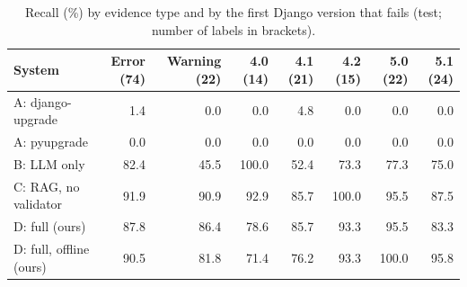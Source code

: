 \begin{table}[t]
\centering
\footnotesize
\setlength{\tabcolsep}{4pt}
\caption{Recall (\%) by evidence type and by the first Django version that fails (test; number of labels in brackets).}
\label{tab:breakdown-test}
\begin{tabular}{lrrrrrrr}
\toprule
System & Error (74) & Warning (22) & 4.0 (14) & 4.1 (21) & 4.2 (15) & 5.0 (22) & 5.1 (24) \\
\midrule
A: django-upgrade & 1.4 & 0.0 & 0.0 & 4.8 & 0.0 & 0.0 & 0.0 \\
A: pyupgrade & 0.0 & 0.0 & 0.0 & 0.0 & 0.0 & 0.0 & 0.0 \\
B: LLM only & 82.4 & 45.5 & 100.0 & 52.4 & 73.3 & 77.3 & 75.0 \\
C: RAG, no validator & 91.9 & 90.9 & 92.9 & 85.7 & 100.0 & 95.5 & 87.5 \\
D: full (ours) & 87.8 & 86.4 & 78.6 & 85.7 & 93.3 & 95.5 & 83.3 \\
D: full, offline (ours) & 90.5 & 81.8 & 71.4 & 76.2 & 93.3 & 100.0 & 95.8 \\
\bottomrule
\end{tabular}
\end{table}
